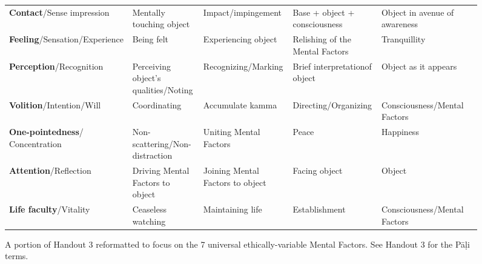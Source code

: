 \begin{figure} [H]

\setlength{\tabcolsep}{0pt}
\renewcommand{\arraystretch}{1.1}

\noindent\begin{tabular}{P{0.25\textwidth} | C{.185\textwidth} C{0.185\textwidth} C{0.185\textwidth} C{0.195\textwidth} m{0mm}}
\toprule
 &  &  &  & \\
\midrule
\textbf{Contact}/\newline Sense impression & Mentally touching object & Impact/\newline impingement & Base + object + consciousness & Object in avenue of awareness &\\[9mm]
\textbf{Feeling}/\newline Sensation/Experience & Being felt & Experiencing object & Relishing of the Mental Factors & Tranquillity &\\[9mm]
\textbf{Perception}/\newline Recognition & Perceiving object’s qualities/\newline Noting & Recognizing/\newline Marking & Brief interpretation\newline of object & Object as it appears &\\[9mm]
\textbf{Volition}/\newline Intention/Will & Coordinating & Accumulate kamma & Directing/\newline Organizing & Consciousness/\newline Mental Factors &\\[9mm]
\textbf{One-pointedness}/ Concentration & Non-scattering/\newline Non-distraction & Uniting Mental Factors & Peace & Happiness &\\[9mm]
\textbf{Attention}/\newline Reflection & Driving Mental Factors to object & Joining Mental Factors to object & Facing object & Object &\\[9mm]
\textbf{Life faculty}/\newline Vitality & Ceaseless watching & Maintaining life & Establishment & Consciousness/\newline Mental Factors &\\[9mm]
\bottomrule
\end{tabular} 

\caption{A portion of Handout 3 reformatted to focus on the 7 universal ethically-variable Mental Factors. See Handout 3 for the Pāḷi terms.}

\end{figure}

